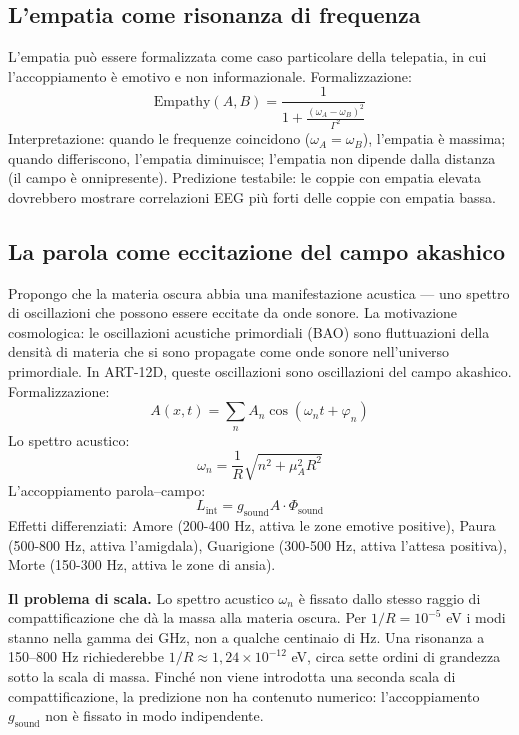 \subsection{L'empatia come risonanza di frequenza}
L'empatia può essere formalizzata come caso particolare della telepatia, in cui l'accoppiamento è emotivo e non informazionale. Formalizzazione:
\begin{equation}
\text{Empathy}(A,B) = \frac{1}{1 + \frac{(\omega_A - \omega_B)^2}{\Gamma^2}}
\end{equation}
Interpretazione: quando le frequenze coincidono ($\omega_A = \omega_B$), l'empatia è massima; quando differiscono, l'empatia diminuisce; l'empatia non dipende dalla distanza (il campo è onnipresente). Predizione testabile: le coppie con empatia elevata dovrebbero mostrare correlazioni EEG più forti delle coppie con empatia bassa.

\subsection{La parola come eccitazione del campo akashico}
Propongo che la materia oscura abbia una manifestazione acustica --- uno spettro di oscillazioni che possono essere eccitate da onde sonore. La motivazione cosmologica: le oscillazioni acustiche primordiali (BAO) sono fluttuazioni della densità di materia che si sono propagate come onde sonore nell'universo primordiale. In ART-12D, queste oscillazioni sono oscillazioni del campo akashico. Formalizzazione:
\begin{equation}
A(x,t) = \sum_n A_n \cos(\omega_n t + \varphi_n)
\end{equation}
Lo spettro acustico:
\begin{equation}
\omega_n = \frac{1}{R} \sqrt{n^2 + \mu_A^2 R^2}
\end{equation}
L'accoppiamento parola--campo:
\begin{equation}
L_{\text{int}} = g_{\text{sound}} A \cdot \Phi_{\text{sound}}
\end{equation}
Effetti differenziati: Amore (200-400 Hz, attiva le zone emotive positive), Paura (500-800 Hz, attiva l'amigdala), Guarigione (300-500 Hz, attiva l'attesa positiva), Morte (150-300 Hz, attiva le zone di ansia).

\textbf{Il problema di scala.} Lo spettro acustico $\omega_n$ è fissato dallo stesso raggio di compattificazione che dà la massa alla materia oscura. Per $1/R = 10^{-5}$ eV i modi stanno nella gamma dei GHz, non a qualche centinaio di Hz. Una risonanza a 150--800 Hz richiederebbe $1/R \approx 1,24\times10^{-12}$ eV, circa sette ordini di grandezza sotto la scala di massa. Finché non viene introdotta una seconda scala di compattificazione, la predizione non ha contenuto numerico: l'accoppiamento $g_{\text{sound}}$ non è fissato in modo indipendente.

